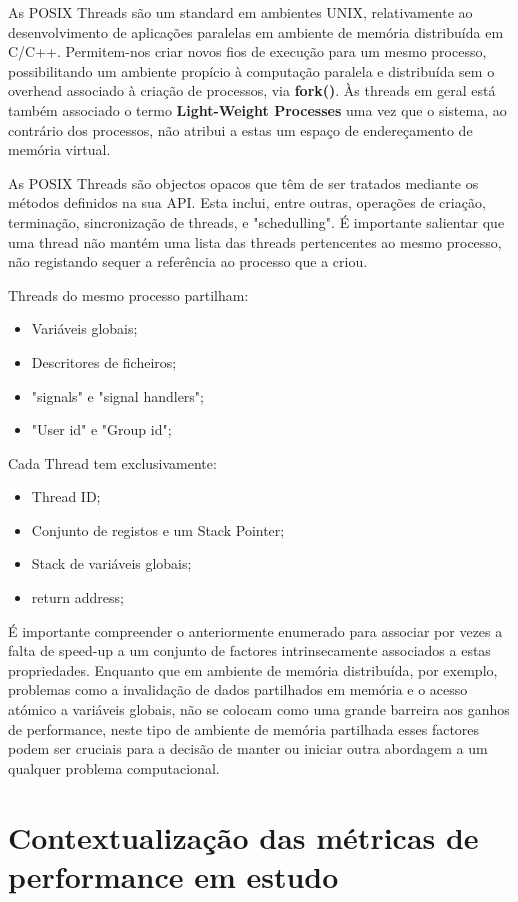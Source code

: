 \documentclass[conference,compsoc]{IEEEtran}
\begin{document}
As POSIX Threads são um standard em ambientes UNIX, relativamente ao desenvolvimento de aplicações paralelas em ambiente de memória distribuída em C/C++. Permitem-nos criar novos fios de execução para um mesmo processo, possibilitando um ambiente propício à computação paralela e distribuída sem o overhead associado à criação de processos, via \textbf{fork()}. Às threads em geral está também associado o termo \textbf{Light-Weight Processes} uma vez que o sistema, ao contrário dos processos, não atribui a estas um espaço de endereçamento de memória virtual. \par
As POSIX Threads são objectos opacos que têm de ser tratados mediante os métodos definidos na sua API. Esta inclui, entre outras, operações de criação, terminação, sincronização de threads, e "schedulling". É importante salientar que uma thread não mantém uma lista das threads pertencentes ao mesmo processo, não registando sequer a referência ao processo que a criou.  \par
Threads do mesmo processo partilham:
\begin{itemize}
\item Variáveis globais;
\item Descritores de ficheiros;
\item "signals" e "signal handlers";
\item "User id" e "Group id";
\end{itemize}
Cada Thread tem exclusivamente:
\begin{itemize}
\item Thread ID;
\item Conjunto de registos e um Stack Pointer;
\item Stack de variáveis globais;
\item return address;
\end{itemize}
É importante compreender o anteriormente enumerado para associar por vezes a falta de speed-up a um conjunto de factores intrinsecamente associados a estas propriedades. Enquanto que em ambiente de memória distribuída, por exemplo, problemas como a invalidação de dados partilhados em memória e o acesso atómico a variáveis globais, não se colocam como uma grande barreira aos ganhos de performance, neste tipo de ambiente de memória partilhada esses factores podem ser cruciais para a decisão de manter ou iniciar outra abordagem a um qualquer problema computacional.

\section{Contextualização das métricas de performance em estudo}
\end{document}
